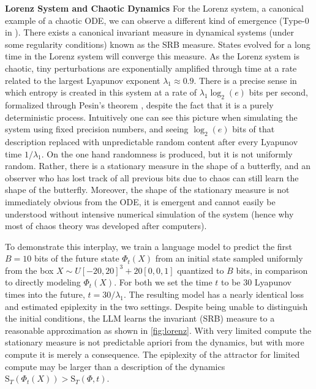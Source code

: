 \documentclass[twoside]{article}
\newcommand{\rS}{\mathrm{S}}
\begin{document}
\textbf{Lorenz System and Chaotic Dynamics}
For the Lorenz system, a canonical example of a chaotic ODE, we can observe a different kind of emergence (Type-0 in \citet{carroll2024emergence}). There exists a canonical invariant measure in dynamical systems (under some regularity conditions) known as the SRB measure\citep{metzger2000sinai}. States evolved for a long time in the Lorenz system will converge this measure. As the Lorenz system is chaotic, tiny perturbations are exponentially amplified through time at a rate related to the largest Lyapunov exponent $\lambda_1 \approx 0.9$. There is a precise sense in which entropy is created in this system at a rate of $\lambda_1 \log_2(e)$ bits per second, formalized through Pesin's theorem \citep{pesin1977characteristic}, despite the fact that it is a purely deterministic process. Intuitively one can see this picture when simulating the system using fixed precision numbers, and seeing $\log_2(e)$ bits of that description replaced with unpredictable random content after every Lyapunov time $1/\lambda_1$. On the one hand randomness is produced, but it is not uniformly random. Rather, there is a stationary measure in the shape of a butterfly, and an observer who has lost track of all previous bits due to chaos can still learn the shape of the butterfly. Moreover, the shape of the stationary measure is not immediately obvious from the ODE, it is emergent and cannot easily be understood without intensive numerical simulation of the system (hence why most of chaos theory was developed after computers).

%
%
%
%
%
%


To demonstrate this interplay, we train a language model to predict the first $B=10$ bits of the future state $\Phi_t(X)$ from an initial state sampled uniformly from the box $X\sim U[-20,20]^3 + 20[0,0,1]$ quantized to $B$ bits, in comparison to directly modeling $\Phi_t(X)$. For both we set the time $t$ to be $30$ Lyapunov times into the future, $t=30/\lambda_1$. The resulting model has a nearly identical loss and estimated epiplexity in the two settings. Despite being unable to distinguish the initial conditions, the LLM learns the invariant (SRB) measure to a reasonable approximation as shown in \autoref{fig:lorenz}.
%
With very limited compute the stationary measure is not predictable apriori from the dynamics, but with more compute it is merely a consequence. The epiplexity of the attractor for limited compute may be larger than a description of the dynamics $\rS_T(\Phi_t(X)) > \rS_T(\Phi,t)$. 
\end{document}
